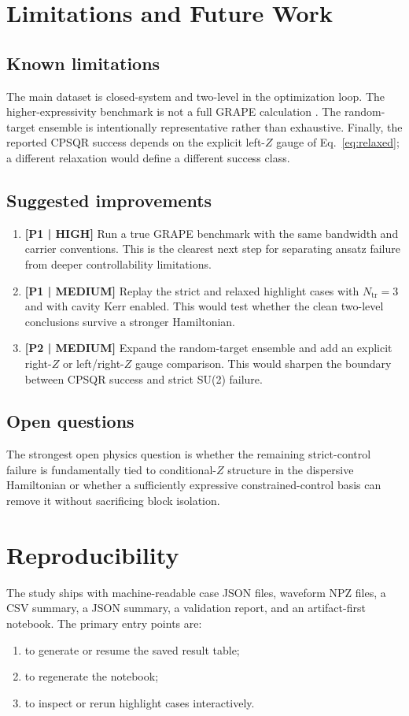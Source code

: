 \documentclass[aps,pra,twocolumn,reprint,floatfix,amsmath,amssymb]{revtex4-2}
\begin{document}
\section{Limitations and Future Work}
\subsection{Known limitations}
The main dataset is closed-system and two-level in the optimization loop.  The higher-expressivity benchmark is not a full GRAPE calculation \cite{khaneja2005grape}.  The random-target ensemble is intentionally representative rather than exhaustive.  Finally, the reported CPSQR success depends on the explicit left-$Z$ gauge of Eq.~\eqref{eq:relaxed}; a different relaxation would define a different success class.

\subsection{Suggested improvements}
\begin{enumerate}
\item \textbf{[P1 | HIGH]} Run a true GRAPE benchmark with the same bandwidth and carrier conventions.  This is the clearest next step for separating ansatz failure from deeper controllability limitations.
\item \textbf{[P1 | MEDIUM]} Replay the strict and relaxed highlight cases with $N_{\mathrm{tr}}=3$ and with cavity Kerr enabled.  This would test whether the clean two-level conclusions survive a stronger Hamiltonian.
\item \textbf{[P2 | MEDIUM]} Expand the random-target ensemble and add an explicit right-$Z$ or left/right-$Z$ gauge comparison.  This would sharpen the boundary between CPSQR success and strict SU(2) failure.
\end{enumerate}

\subsection{Open questions}
The strongest open physics question is whether the remaining strict-control failure is fundamentally tied to conditional-$Z$ structure in the dispersive Hamiltonian or whether a sufficiently expressive constrained-control basis can remove it without sacrificing block isolation.

\section{Reproducibility}
The study ships with machine-readable case JSON files, waveform NPZ files, a CSV summary, a JSON summary, a validation report, and an artifact-first notebook.  The primary entry points are:
\begin{enumerate}
\item {} to generate or resume the saved result table;
\item {} to regenerate the notebook;
\item {} to inspect or rerun highlight cases interactively.
\end{enumerate}
\end{document}
